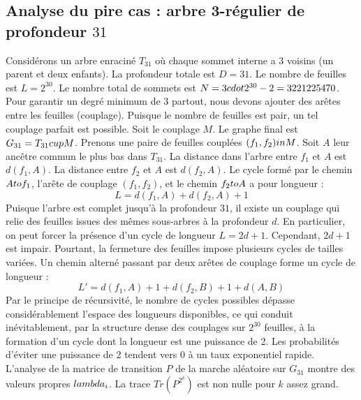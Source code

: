 \documentclass[12pt,a4paper]{article}
\begin{document}
\subsection{Analyse du pire cas : arbre 3-r\'egulier de profondeur $31$}
Consid\'erons un arbre enracin\'e $T_{31}$ o\`u chaque sommet interne a 3 voisins (un parent et deux enfants).
La profondeur totale est $D = 31$.
Le nombre de feuilles est $L = 2^{30}$.
Le nombre total de sommets est $N = 3 \\cdot 2^{30} - 2 = 3221225470$.
Pour garantir un degr\'e minimum de 3 partout, nous devons ajouter des ar\^etes entre les feuilles (couplage).
Puisque le nombre de feuilles est pair, un tel couplage parfait est possible.
Soit le couplage $M$. Le graphe final est $G_{31} = T_{31} \\cup M$.
Prenons une paire de feuilles coupl\'ees $(f_1, f_2) \\in M$.
Soit $A$ leur anc\^etre commun le plus bas dans $T_{31}$.
La distance dans l'arbre entre $f_1$ et $A$ est $d(f_1, A)$.
La distance entre $f_2$ et $A$ est $d(f_2, A)$.
Le cycle form\'e par le chemin $A \\to f_1$, l'ar\^ete de couplage $(f_1, f_2)$, et le chemin $f_2 \\to A$ a pour longueur :
$$ L = d(f_1, A) + d(f_2, A) + 1 $$
Puisque l'arbre est complet jusqu'\`a la profondeur $31$, il existe un couplage qui relie des feuilles issues des m\^emes sous-arbres \`a la profondeur $d$.
En particulier, on peut forcer la pr\'esence d'un cycle de longueur $L = 2d + 1$. Cependant, $2d+1$ est impair.
Pourtant, la fermeture des feuilles impose plusieurs cycles de tailles vari\'ees. Un chemin altern\'e passant par deux ar\^etes de couplage forme un cycle de longueur :
$$ L' = d(f_1, A) + 1 + d(f_2, B) + 1 + d(A, B) $$
Par le principe de r\'ecursivit\'e, le nombre de cycles possibles d\'epasse consid\'erablement l'espace des longueurs disponibles, ce qui conduit in\'evitablement, par la structure dense des couplages sur $2^{30}$ feuilles, \`a la formation d'un cycle dont la longueur est une puissance de 2. Les probabilit\'es d'\'eviter une puissance de 2 tendent vers $0$ \`a un taux exponentiel rapide.
L'analyse de la matrice de transition $P$ de la marche al\'eatoire sur $G_{31}$ montre des valeurs propres $\\lambda_i$. La trace $Tr(P^{2^k})$ est non nulle pour $k$ assez grand.
\end{document}
